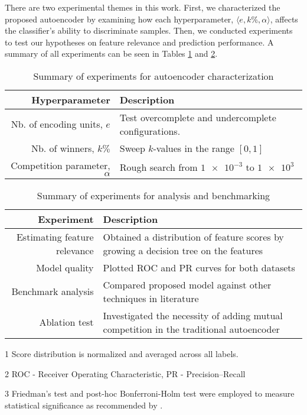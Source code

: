 There are two experimental themes in this work. First, we characterized the
proposed autoencoder by examining how each hyperparameter, $\langle e, k\%,
\alpha \rangle$, affects the classifier's ability to discriminate samples.
Then, we conducted experiments to test our hypotheses on feature relevance and
prediction performance. A summary of all experiments can be seen in Tables
\ref{exp:hyperparameter} and \ref{exp:key_results}.

\begin{table}[!h]
  \centering
  \caption{Summary of experiments for autoencoder characterization}
  \label{exp:hyperparameter}
      \begin{tabular}{@{}rp{}@{}}
          \toprule
          Hyperparameter                      & Description \\ \midrule
          Nb. of encoding units, $e$    & Test overcomplete and undercomplete configurations.\\
          Nb. of winners, $k\%$     & Sweep $k$-values in the range $\left[ 0,1\right]$\\
          Competition parameter, $\alpha$ & Rough search from $\num{1e-3}$ to $\num{1e3}$\\ \bottomrule
      \end{tabular}
\end{table}

\begin{table}[!h]
  \centering
  \caption{Summary of experiments for analysis and benchmarking}
  \label{exp:key_results}
  \begin{threeparttable}
      \begin{tabular}{@{}rp{}@{}}
          \toprule
          Experiment                      & Description \\ \midrule
          Estimating feature relevance    & Obtained a distribution of feature scores by growing a decision tree on the features\tnote{1} \\
          Model quality         & Plotted ROC and PR curves for both
          datasets\tnote{2}\\
          Benchmark analysis     & Compared proposed model against other
          techniques in literature\tnote{3}\\
          Ablation test                   & Investigated the necessity of adding
          mutual competition in the traditional autoencoder\\\bottomrule
      \end{tabular}
  \begin{tablenotes}
      \footnotesize
      \item[1] Score distribution is normalized and averaged across all labels.
      \item[2] ROC - Receiver Operating Characteristic, PR - Precision--Recall
      \item[3] Friedman's test \parencite{friedman1937use} and post-hoc Bonferroni-Holm test \parencite{holm1979simple}
      were employed to measure statistical significance as recommended by \cite{demsar2006statistical}.
  \end{tablenotes}
  \end{threeparttable}
\end{table}

